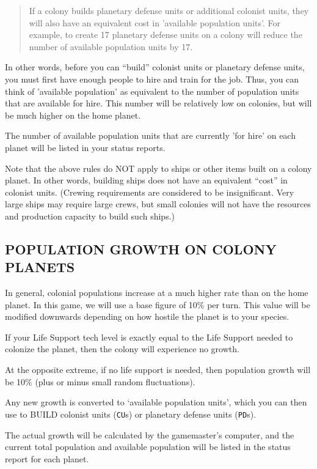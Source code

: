 \documentclass[10pt,titlepage]{article}
\begin{document}
\begin{quotation}
	If a colony builds planetary defense units or additional colonist
	units, they will also have an equivalent cost in 'available
	population units'.  For example, to create 17 planetary defense
	units on a colony will reduce the number of available population
	units by 17.\end{quotation} 

In other words, before you can ``build'' colonist units or planetary defense
units, you must first have enough people to hire and train for the job.
Thus, you can think of 'available population' as equivalent to the number of
population units that are available for hire.  This number will be relatively
low on colonies, but will be much higher on the home planet.

The number of available population units that are currently 'for hire' on each
planet will be listed in your status reports.

Note that the above rules do NOT apply to ships or other items built on a
colony planet.  In other words, building ships does not have an equivalent
``cost'' in colonist units.  (Crewing requirements are considered to be
insignificant.  Very large ships may require large crews, but small colonies
will not have the resources and production capacity to build such ships.)


\subsection{POPULATION GROWTH ON COLONY PLANETS}
\label{sec:populationgrowth}


In general, colonial populations increase at a much higher rate than on the
home planet.  In this game, we will use a base figure of 10\% per turn.  This
value will be modified downwards depending on how hostile the planet is to
your species.

If your Life Support tech level is exactly equal to the Life Support needed to
colonize the planet, then the colony will experience no growth.

At the opposite extreme, if no life support is needed, then population growth
will be 10\% (plus or minus small random fluctuations).

Any new growth is converted to `available population units', which you can then
use to BUILD colonist units (\texttt{CU}s) or planetary defense units (\texttt{PD}s).

The actual growth will be calculated by the gamemaster's computer, and the
current total population and available population will be listed in the status
report for each planet.
\end{document}
